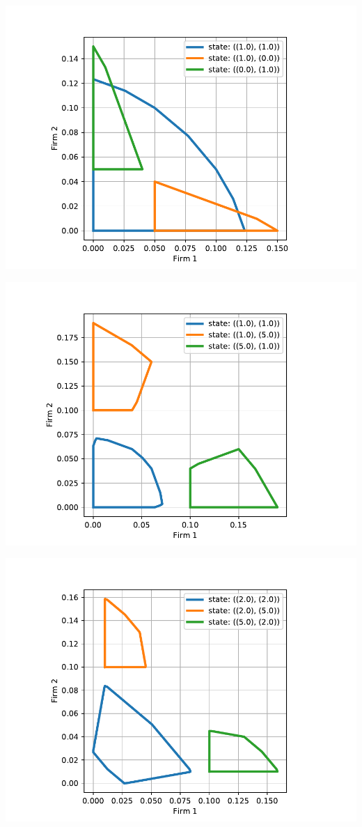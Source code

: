 \documentclass[11pt]{article}
\begin{document}
\includegraphics[width=.9\linewidth]{./img/overlap_7_6_1.pdf}

\includegraphics[width=.9\linewidth]{./img/overlap_7_11_31.pdf}

\includegraphics[width=.9\linewidth]{./img/overlap_14_17_32.pdf}
\end{document}
